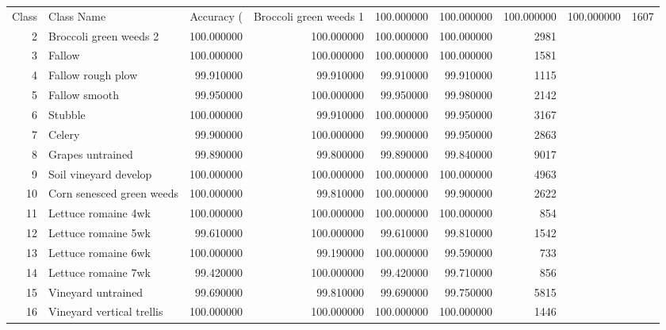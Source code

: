 \begin{tabular}{rlrrrrr}
\toprule
Class & Class Name & Accuracy (%
 & Broccoli green weeds 1 & 100.000000 & 100.000000 & 100.000000 & 100.000000 & 1607 \\
2 & Broccoli green weeds 2 & 100.000000 & 100.000000 & 100.000000 & 100.000000 & 2981 \\
3 & Fallow & 100.000000 & 100.000000 & 100.000000 & 100.000000 & 1581 \\
4 & Fallow rough plow & 99.910000 & 99.910000 & 99.910000 & 99.910000 & 1115 \\
5 & Fallow smooth & 99.950000 & 100.000000 & 99.950000 & 99.980000 & 2142 \\
6 & Stubble & 100.000000 & 99.910000 & 100.000000 & 99.950000 & 3167 \\
7 & Celery & 99.900000 & 100.000000 & 99.900000 & 99.950000 & 2863 \\
8 & Grapes untrained & 99.890000 & 99.800000 & 99.890000 & 99.840000 & 9017 \\
9 & Soil vineyard develop & 100.000000 & 100.000000 & 100.000000 & 100.000000 & 4963 \\
10 & Corn senesced green weeds & 100.000000 & 99.810000 & 100.000000 & 99.900000 & 2622 \\
11 & Lettuce romaine 4wk & 100.000000 & 100.000000 & 100.000000 & 100.000000 & 854 \\
12 & Lettuce romaine 5wk & 99.610000 & 100.000000 & 99.610000 & 99.810000 & 1542 \\
13 & Lettuce romaine 6wk & 100.000000 & 99.190000 & 100.000000 & 99.590000 & 733 \\
14 & Lettuce romaine 7wk & 99.420000 & 100.000000 & 99.420000 & 99.710000 & 856 \\
15 & Vineyard untrained & 99.690000 & 99.810000 & 99.690000 & 99.750000 & 5815 \\
16 & Vineyard vertical trellis & 100.000000 & 100.000000 & 100.000000 & 100.000000 & 1446 \\
\bottomrule
\end{tabular}
